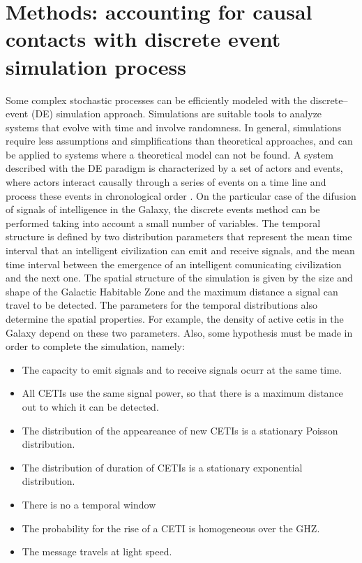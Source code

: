 \documentclass[useAMS,usenatbib]{mnras}
\begin{document}
\section{Methods: accounting for causal contacts with 
discrete event simulation process}

Some complex stochastic processes can be efficiently modeled with the
discrete--event (DE) simulation approach.
%
Simulations are suitable tools to analyze systems that evolve with
time and involve randomness.
%
In general, simulations require less assumptions and simplifications
than theoretical approaches, and can be applied to systems where 
a theoretical model can not be found.
%
A system described with the DE paradigm is characterized by a set of
actors and events, where actors interact causally through a series of
events on a time line and process these events in chronological order
\citep{ptolemaeus_book, chung_book, simulation_book}.
%
On the particular case of the difusion of signals of intelligence in
the Galaxy, the discrete events method can be performed taking into
account a small number of variables.
%
The temporal structure is defined by two distribution parameters that
represent the mean time interval that an intelligent civilization can
emit and receive signals, and the mean time interval between the
emergence of an intelligent comunicating civilization and the next one.
%
The spatial structure of the simulation is given by the size and shape
of the Galactic Habitable Zone and the maximum distance a signal can
travel to be detected.
%
The parameters for the temporal distributions also determine the
spatial properties.
%
For example, the density of active cetis in the Galaxy depend on these
two parameters.
%
Also, some hypothesis must be made in order to complete the
simulation, namely:

\begin{itemize}
   \item The capacity to emit signals and to receive signals ocurr at
      the same time.
   \item All CETIs use the same signal power, so that there is a
      maximum distance out to which it can be detected.
   \item The distribution of the appeareance of new CETIs
      is a stationary Poisson distribution.
   \item The distribution of duration of CETIs
      is a stationary exponential distribution.
   \item There is no a temporal window 
   \item The probability for the rise of a CETI is homogeneous
      over the GHZ.
   \item The message travels at light speed.
\end{itemize}
\end{document}
